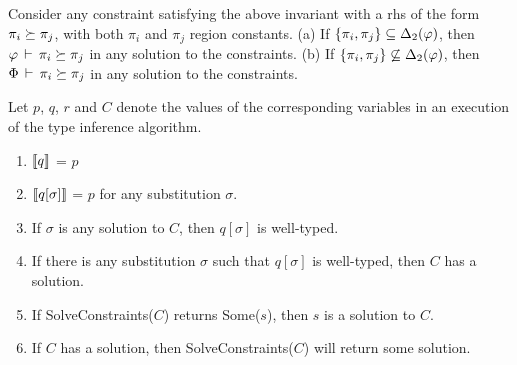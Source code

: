 \begin{lemma}
  Consider any constraint satisfying the above invariant with a rhs of the
  form $\pi_i \succeq \pi_j$, with both $\pi_i$ and $\pi_j$ region constants.
  (a) If $\{ \pi_i, \pi_j \} \subseteq {\Delta_2}(\varphi)$,
  then $\varphi\,\vdash\,\pi_i \succeq \pi_j$ in any solution to the constraints.
  (b) If $\{ \pi_i, \pi_j \} \not \subseteq {\Delta_2}(\varphi)$,
  then $\Phi\,\vdash\,\pi_i \succeq \pi_j$ in any solution to the constraints.
\end{lemma}

\begin{theorem}
Let $p$, $q$, $r$ and $C$ denote the values of the corresponding
variables in an execution of the type inference algorithm.
\begin{enumerate}
\item $\llbracket q \rrbracket$ = $p$
\item $\llbracket q[\sigma] \rrbracket$ = $p$ for any substitution $\sigma$.
\item If $\sigma$ is any solution to $C$, then $q[\sigma]$ is well-typed.
\item If there is any substitution $\sigma$ such that $q[\sigma]$ is well-typed, then
$C$ has a solution.
\item If SolveConstraints($C$) returns Some($s$), then $s$ is a solution to $C$.
\item If $C$ has a  solution, then SolveConstraints($C$) will return some solution.
\end{enumerate}
\end{theorem}

